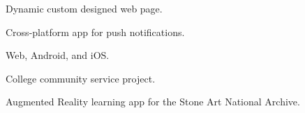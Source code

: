 \documentclass[]{plushcv}
\begin{document}
\begin{minipage}[t]{0.70\textwidth}
\begin{tightemize}
\item Dynamic custom designed web page.
\end{tightemize}
\sectionsep

\begin{tightemize}
\item Cross-platform app for push notifications.
\item Web, Android, and iOS.
\end{tightemize}
\sectionsep

\begin{tightemize}
\item College community service project. 
\item Augmented Reality learning app for the Stone Art National Archive.
\end{tightemize}
\sectionsep


%
%

\end{minipage} 
\hfill
\end{document}
